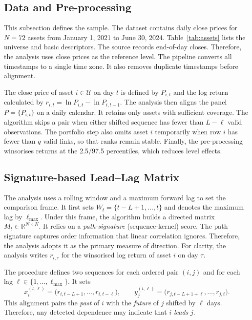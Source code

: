 \subsection{Data and Pre-processing}
This subsection defines the sample. The dataset contains daily close prices for $N=72$ assets from January 1, 2021 to June 30, 2024. Table~\ref{tab:assets} lists the universe and basic descriptors. The source records end-of-day closes. Therefore, the analysis uses close prices as the reference level. The pipeline converts all timestamps to a single time zone. It also removes duplicate timestamps before alignment.

The close price of asset $i\in\mathcal{U}$ on day $t$ is defined by $P_{i,t}$ and the log return calculated by $r_{i,t}=\ln P_{i,t}-\ln P_{i,t-1}$. The analysis then aligns the panel $P=\{P_{i,t}\}$ on a daily calendar. It retains only assets with sufficient coverage. The algorithm skips a pair when either shifted sequence has fewer than $L-\ell$ valid observations. The portfolio step also omits asset $i$ temporarily when row $i$ has fewer than $q$ valid links, so that ranks remain stable. Finally, the pre-processing winsorises returns at the 2.5/97.5 percentiles, which reduces level effects.

\subsection{Signature-based Lead--Lag Matrix}\label{sec:signature}
The analysis uses a rolling window and a maximum forward lag to set the comparison frame. It first sets $W_t=\{t-L+1,\ldots,t\}$ and denotes the maximum lag by $\ell_{\max}$. Under this frame, the algorithm builds a directed matrix $M_t\in\mathbb{R}^{N\times N}$. It relies on a \emph{path-signature} (sequence-kernel) score. The path signature captures order information that linear correlation ignores. Therefore, the analysis adopts it as the primary measure of direction. For clarity, the analysis writes $r_{i,\tau}$ for the winsorised log return of asset $i$ on day $\tau$.

The procedure defines two sequences for each ordered pair $(i,j)$ and for each lag $\ell\in\{1,\ldots,\ell_{\max}\}$. It sets
\[
x^{(t,\ell)}_{i}=\big(r_{i,t-L+1},\ldots,r_{i,t-\ell}\big),\qquad
y^{(t,\ell)}_{j}=\big(r_{j,t-L+1+\ell},\ldots,r_{j,t}\big).
\]
This alignment pairs the \emph{past} of $i$ with the \emph{future} of $j$ shifted by $\ell$ days. Therefore, any detected dependence may indicate that $i$ \emph{leads} $j$.

